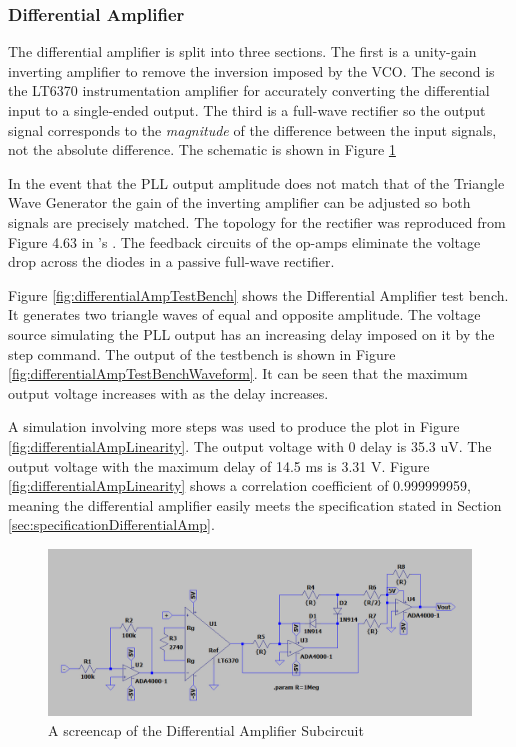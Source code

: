 \subsubsection{Differential Amplifier}
The differential amplifier is split into three sections.
The first is a unity-gain inverting amplifier to remove the inversion imposed by the VCO.
The second is the LT6370 instrumentation amplifier for accurately converting the differential input to a single-ended output.
The third is a full-wave rectifier so the output signal corresponds to the \textit{magnitude} of the difference between the input signals, not the absolute difference.
The schematic is shown in Figure \ref{fig:differentialAmpSchematic}

In the event that the PLL output amplitude does not match that of the Triangle Wave Generator the gain of the inverting amplifier can be adjusted so both signals are precisely matched.
The topology for the rectifier was reproduced from Figure 4.63 in \citeauthor{rectifierTopology}'s \cite{rectifierTopology}.
The feedback circuits of the op-amps eliminate the voltage drop across the diodes in a passive full-wave rectifier. 

Figure \ref{fig:differentialAmpTestBench} shows the Differential Amplifier test bench. 
It generates two triangle waves of equal and opposite amplitude. 
The voltage source simulating the PLL output has an increasing delay imposed on it by the step command. 
The output of the testbench is shown in Figure \ref{fig:differentialAmpTestBenchWaveform}. 
It can be seen that the maximum output voltage increases with as the delay increases. 

A simulation involving more steps was used to produce the plot in Figure \ref{fig:differentialAmpLinearity}. 
The output voltage with 0 delay is 35.3 uV.
The output voltage with the maximum delay of 14.5 ms is 3.31 V.
Figure \ref{fig:differentialAmpLinearity} shows a correlation coefficient of 0.999999959, meaning the differential amplifier easily meets the specification stated in Section \ref{sec:specificationDifferentialAmp}. 

\begin{figure}[H]
    \centering 
    \includegraphics[width=\textwidth]{../Circuits/Images/DifferentialAmp/Schematic}
    \caption{A screencap of the Differential Amplifier Subcircuit}
    \label{fig:differentialAmpSchematic}
\end{figure}


